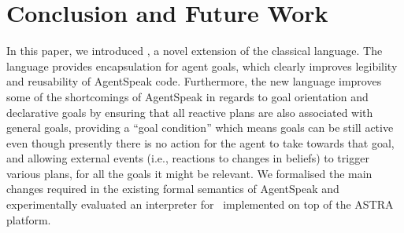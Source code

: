 \section{Conclusion and Future Work}
\label{sec:conclusion}


In this paper, we introduced \aser, a novel extension of the classical
{\asl} language. The language provides encapsulation for agent
goals, which clearly improves legibility and reusability of AgentSpeak
code. Furthermore, the new language improves some of the shortcomings
of AgentSpeak in regards to goal orientation and declarative goals by
ensuring that all reactive plans are also associated with general
goals, providing a ``goal condition'' which means goals can be still
active even though presently there is no action for the agent to take
towards that goal, and allowing external events (i.e., reactions to
changes in beliefs) to trigger various plans, for all the goals it
might be relevant.  We formalised the main changes required in the
existing formal semantics of AgentSpeak and experimentally evaluated
an interpreter for \aser\ implemented on top of the ASTRA platform.




